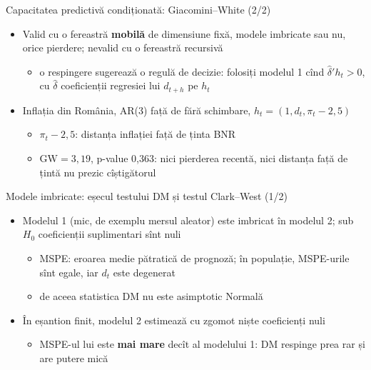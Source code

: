 \begin{frame}{Capacitatea predictivă condiționată: Giacomini--White (2/2)}
\itemsize{\small}
\begin{itemize}
    \item Valid cu o fereastră \textbf{mobilă} de dimensiune fixă, modele imbricate sau nu, orice pierdere; nevalid cu o fereastră recursivă
    \begin{itemize}
        \item o respingere sugerează o regulă de decizie: folosiți modelul 1 cînd $\hat\delta'h_t > 0$, cu $\hat\delta$ coeficienții regresiei lui $d_{t+h}$ pe $h_t$
    \end{itemize}
    \item Inflația din România, AR(3) față de fără schimbare, $h_t = (1, d_t, \pi_t - 2{,}5)$
    \begin{itemize}
        \item $\pi_t - 2{,}5$: distanța inflației față de ținta BNR
        \item $\mathrm{GW} = 3{,}19$, p-value 0{,}363: nici pierderea recentă, nici distanța față de țintă nu prezic cîștigătorul
    \end{itemize}
\end{itemize}
\end{frame}

\begin{frame}{Modele imbricate: eșecul testului DM și testul Clark--West (1/2)}
\itemsize{\small}
\begin{itemize}
    \item Modelul 1 (mic, de exemplu mersul aleator) este imbricat în modelul 2; sub $H_0$ coeficienții suplimentari sînt nuli
    \begin{itemize}
        \item MSPE: eroarea medie pătratică de prognoză; în populație, MSPE-urile sînt egale, iar $d_t$ este degenerat
        \item de aceea statistica DM nu este asimptotic Normală 
    \end{itemize}
    \item În eșantion finit, modelul 2 estimează cu zgomot niște coeficienți nuli
    \begin{itemize}
        \item MSPE-ul lui este \textbf{mai mare} decît al modelului 1: DM respinge prea rar și are putere mică
    \end{itemize}
\end{itemize}
\end{frame}

